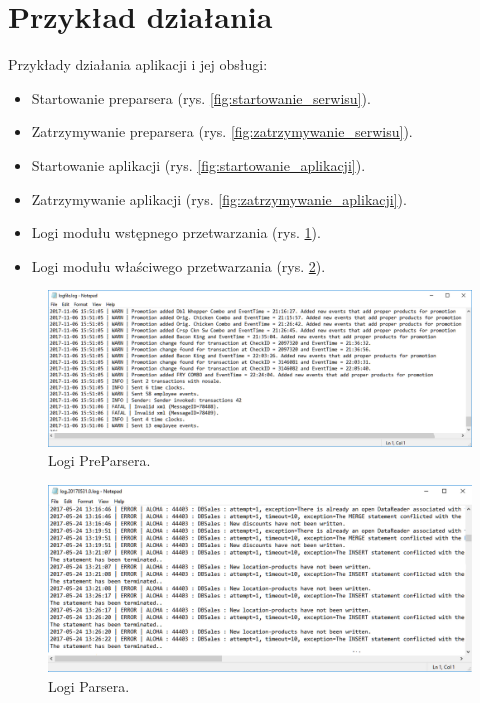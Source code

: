 \documentclass[a4paper]{book}
\begin{document}
\section{Przykład działania}
Przykłady działania aplikacji i jej obsługi:
 \begin{itemize}
	\item Startowanie preparsera (rys. \ref{fig:startowanie_serwisu}).
	\item Zatrzymywanie preparsera (rys. \ref{fig:zatrzymywanie_serwisu}).
	\item Startowanie aplikacji (rys. \ref{fig:startowanie_aplikacji}).
	\item Zatrzymywanie aplikacji (rys. \ref{fig:zatrzymywanie_aplikacji}).
	\item Logi modułu wstępnego przetwarzania (rys. \ref{fig:preparser_log}).
	\item Logi modułu właściwego przetwarzania (rys. \ref{fig:parser_log}).
\end{itemize}
\begin{figure}[t]
	\centering
	\hspace*{-5cm}\includegraphics[scale=0.7]{./img/preparser_log.png}
	\caption{Logi PreParsera.}
	\label{fig:preparser_log}
\end{figure}
\begin{figure}[t]
	\centering
	\hspace*{-5cm}\includegraphics[scale=0.75]{./img/parser_log.png}
	\caption{Logi Parsera.}
	\label{fig:parser_log}
\end{figure}
\end{document}
